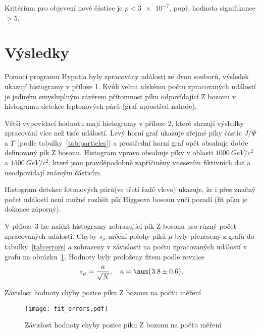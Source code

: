 \documentclass{scirep}
\begin{document}
    Kritérium pro objevení nové částice je $p < \num{3e-7}$, popř. hodnota signifikance $> 5$.

    \section*{Výsledky}

    Pomocí programu Hypatia byly zpracovány události ze dvou souborů, výsledek ukazují histogramy v příloze 1.
    Kvůli velmi nízkému počtu zpracovaných událostí je jediným smysluplným závěrem přítomnost píku odpovídající Z bozonu v histogramu detekce leptonových párů (graf uprostřed nahoře).

    Větší vypovídací hodnotu mají histogramy v příloze 2, které shrnují výsledky zpracování více než tisíc událostí.
    Levý horní graf ukazuje zřejmé píky částic $J / \Psi$ a $\Upsilon$ (podle tabulky~\ref{tab:particles}) a prostřední horní graf opět obsahuje dobře definovaný pík Z bosonu.
    Histogram vpravo obsahuje píky v oblasti $\SI{1000}{GeV/c^2}$ a $\SI{1500}{GeV/c^2}$, které jsou pravděpodobně zapříčiněny vnesením fiktivních dat a neodpovídají známým částicím.

    Histogram detekce fotonových párů(ve třetí řadě vlevo) ukazuje, že i přes značný počet událostí není možné rozlišit pík Higgsova bosonu vůči pozadí (fit píku je dokonce záporný).

    V příloze 3 lze nalézt histogramy zobrazující pík Z bosonu pro různý počet zpracovaných událostí.
    Chyby $s_{\mu}$ určení polohy píků $\mu$ byly přeneseny z grafů do tabulky~\ref{tab:errors} a zobrazeny v závislosti na počtu zpracovaných událostí v grafu na obrázku~\ref{fig:fit_errors}.
    Hodnoty byly proloženy fitem podle rovnice
    \[ s_{\mu} = \frac{a}{\sqrt{N}},~~~ a = \num{3.8 \pm 0.6}. \]

    
\begin{table}[h]
    \centering
    \setlength{\tabcolsep}{15pt}
    
    \vspace{0pt}
    \caption{Závislost hodnoty chyby pozice píku Z bozonu na počtu měření}
    \label{tab:errors}
\end{table}

    
\begin{figure}[h!]
    \centering
    \texttt{[image: fit\_errors.pdf]}
    \vspace{0pt}
    \caption{Závislost hodnoty chyby pozice píku Z bozonu na počtu měření}
    \label{fig:fit_errors}
\end{figure}
\end{document}
